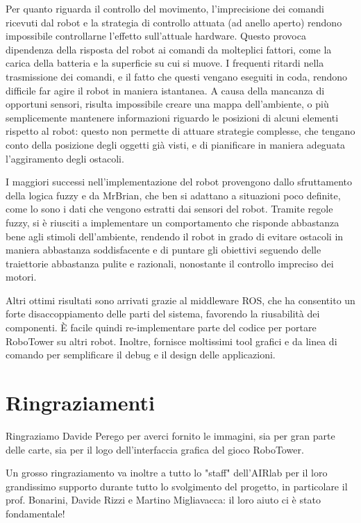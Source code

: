 Per quanto riguarda il controllo del movimento, l'imprecisione dei comandi ricevuti dal robot e la strategia di controllo attuata (ad anello aperto) rendono impossibile controllarne l'effetto sull'attuale hardware. Questo provoca dipendenza della risposta del robot ai comandi da molteplici fattori, come la carica della batteria e la superficie su cui si muove. I frequenti ritardi nella trasmissione dei comandi, e il fatto che questi vengano eseguiti in coda, rendono difficile far agire il robot in maniera istantanea. A causa della mancanza di opportuni sensori, risulta impossibile creare una mappa dell'ambiente, o più semplicemente mantenere informazioni riguardo le posizioni di alcuni elementi rispetto al robot: questo non permette di attuare strategie complesse, che tengano conto della posizione degli oggetti già visti, e di pianificare in maniera adeguata l'aggiramento degli ostacoli.

I maggiori successi nell'implementazione del robot provengono dallo sfruttamento della logica fuzzy e da MrBrian, che ben si adattano a situazioni poco definite, come lo sono i dati che vengono estratti dai sensori del robot. Tramite regole fuzzy, si è riusciti a implementare un comportamento che risponde abbastanza bene agli stimoli dell'ambiente, rendendo il robot in grado di evitare ostacoli in maniera abbastanza soddisfacente e di puntare gli obiettivi seguendo delle traiettorie abbastanza pulite e razionali, nonostante il controllo impreciso dei motori.

Altri ottimi risultati sono arrivati grazie al middleware ROS, che ha consentito un forte disaccoppiamento delle parti del sistema, favorendo la riusabilità dei componenti. È facile quindi re-implementare parte del codice per portare RoboTower su altri robot. Inoltre, fornisce  moltissimi tool grafici e da linea di comando per semplificare il debug e il design delle applicazioni. 


\section*{Ringraziamenti}

Ringraziamo Davide Perego per averci fornito le immagini, sia per gran parte delle carte, sia per il logo dell'interfaccia grafica del gioco RoboTower.

Un grosso ringraziamento va inoltre a tutto lo "staff" dell'AIRlab per il loro grandissimo supporto durante tutto lo svolgimento del progetto, in particolare il prof. Bonarini, Davide Rizzi e Martino Migliavacca: il loro aiuto ci è stato fondamentale!